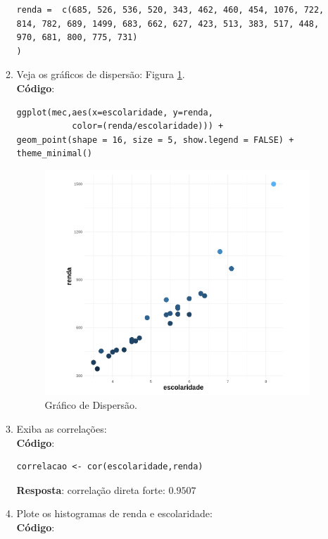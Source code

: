 \documentclass[a4paper,12pt]{article}
\begin{document}
\begin{enumerate}
\begin{enumerate}
\begin{lstlisting}
renda =  c(685, 526, 536, 520, 343, 462, 460, 454, 1076, 722, 
814, 782, 689, 1499, 683, 662, 627, 423, 513, 383, 517, 448, 
970, 681, 800, 775, 731)
)
            \end{lstlisting}
        \item[1.2] Veja os gráficos de dispersão: Figura \ref{fig2disp}.\\
        \textbf{Código}:
            \begin{lstlisting}
ggplot(mec,aes(x=escolaridade, y=renda, 
           color=(renda/escolaridade))) +
geom_point(shape = 16, size = 5, show.legend = FALSE) +
theme_minimal()
            \end{lstlisting}
            \begin{figure}[h!tb]
             \centering
             \includegraphics[scale=0.45]{2_1a_scatter.png}
             \caption{Gráfico de Dispersão.}
             \label{fig2disp}
            \end{figure}
        \item[1.3] Exiba as correlações:\\
        \textbf{Código}:
            \begin{lstlisting}
correlacao <- cor(escolaridade,renda)
            \end{lstlisting}
            \textbf{Resposta}:   correlação direta forte: $0.9507$
        \item[1.4] Plote os histogramas de renda e escolaridade: \\
            \textbf{Código}:

\end{enumerate}
\end{enumerate}
\end{document}
